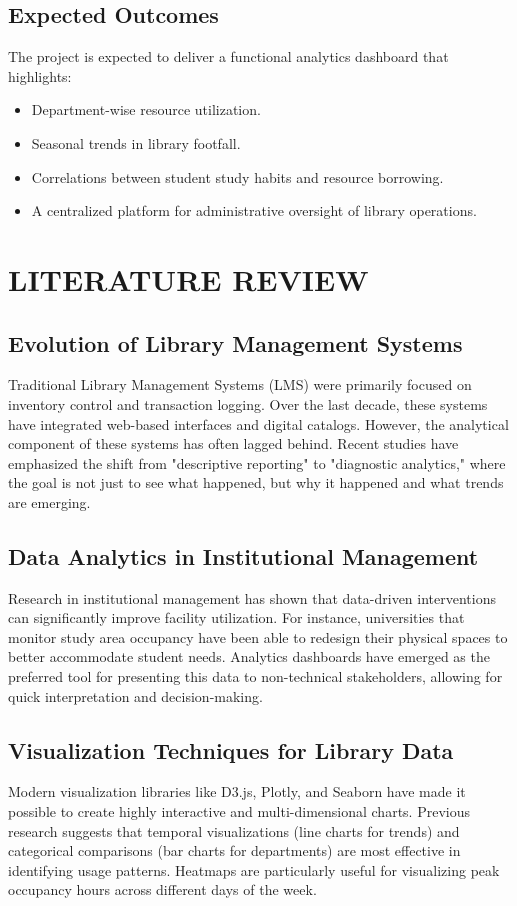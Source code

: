 \documentclass[12pt,a4paper]{report}
\begin{document}
\section{Expected Outcomes}
The project is expected to deliver a functional analytics dashboard that highlights:
\begin{itemize}
    \item Department-wise resource utilization.
    \item Seasonal trends in library footfall.
    \item Correlations between student study habits and resource borrowing.
    \item A centralized platform for administrative oversight of library operations.
\end{itemize}

\chapter{LITERATURE REVIEW}
\section{Evolution of Library Management Systems}
Traditional Library Management Systems (LMS) were primarily focused on inventory control and transaction logging. Over the last decade, these systems have integrated web-based interfaces and digital catalogs. However, the analytical component of these systems has often lagged behind. Recent studies have emphasized the shift from "descriptive reporting" to "diagnostic analytics," where the goal is not just to see what happened, but why it happened and what trends are emerging.

\section{Data Analytics in Institutional Management}
Research in institutional management has shown that data-driven interventions can significantly improve facility utilization. For instance, universities that monitor study area occupancy have been able to redesign their physical spaces to better accommodate student needs. Analytics dashboards have emerged as the preferred tool for presenting this data to non-technical stakeholders, allowing for quick interpretation and decision-making.

\section{Visualization Techniques for Library Data}
Modern visualization libraries like D3.js, Plotly, and Seaborn have made it possible to create highly interactive and multi-dimensional charts. Previous research suggests that temporal visualizations (line charts for trends) and categorical comparisons (bar charts for departments) are most effective in identifying usage patterns. Heatmaps are particularly useful for visualizing peak occupancy hours across different days of the week.
\end{document}
